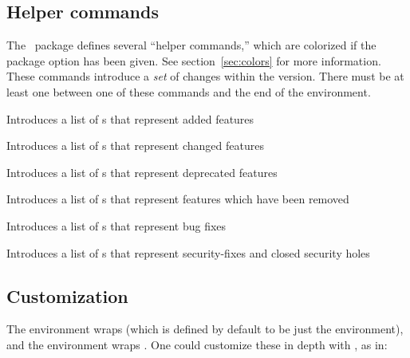 \documentclass{ltxdoc}
\begin{document}
\subsection{Helper commands}

The \cl\ package defines several ``helper commands,'' which are colorized if
the  package option has been given. See
section~\ref{sec:colors} for more information. These commands introduce a
\textit{set} of changes within the version. There must be at least one
 between one of these commands and the end of the 
environment.

\begin{macro}{\added}Introduces a list of s that represent added
	features\end{macro}
\begin{macro}{\changed}Introduces a list of s that represent
	changed features\end{macro}
\begin{macro}{\deprecated}Introduces a list of s that represent
	deprecated features\end{macro}
\begin{macro}{\removed}Introduces a list of s that represent
	features which have been removed\end{macro}
\begin{macro}{\fixed}Introduces a list of s that represent bug
	fixes\end{macro}
\begin{macro}{\security}Introduces a list of s that represent
	security-fixes and closed security holes\end{macro}

\subsection{Customization}

The  environment wraps  (which is
defined by default to be just the  environment), and the
 environment wraps . One could customize
these in depth with , as in:

\begin{latexcode}
\usepackage{enumitem}
\renewenvironment{changelogitemize}
	{\begin{itemize}[label=---]}
	{\end{itemize}}
\end{latexcode}
\end{document}
